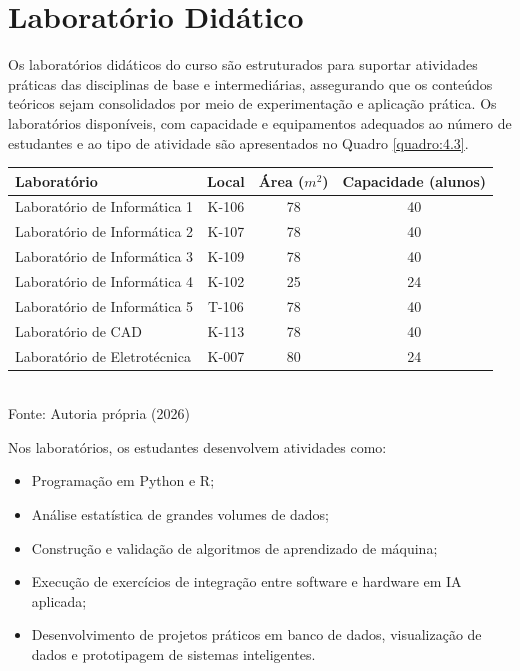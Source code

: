\section{Laboratório Didático}

Os laboratórios didáticos do curso são estruturados para suportar atividades práticas das disciplinas de base e intermediárias, assegurando que os conteúdos teóricos sejam consolidados por meio de experimentação e aplicação prática. Os laboratórios disponíveis, com capacidade e equipamentos adequados ao número de estudantes e ao tipo de atividade são apresentados no Quadro \ref{quadro:4.3}.

\begin{quadro}[htb]
    \centering
    \caption{Características dos laboratórios didáticos}
    \label{quadro:4.3}
    \vspace{0.2cm}
    \begin{tabular}{|l|c|c|c|}
        \hline
        \textbf{Laboratório} & \textbf{Local} & \textbf{Área ($m^2$)} & \textbf{Capacidade (alunos)} \\ \hline
        Laboratório de Informática 1 & K-106 & 78 & 40 \\ \hline
        Laboratório de Informática 2 & K-107 & 78 & 40 \\ \hline
        Laboratório de Informática 3 & K-109 & 78 & 40 \\ \hline
        Laboratório de Informática 4 & K-102 & 25 & 24 \\ \hline
        Laboratório de Informática 5 & T-106 & 78 & 40 \\ \hline
        Laboratório de CAD & K-113 & 78 & 40 \\ \hline
        Laboratório de Eletrotécnica & K-007 & 80 & 24 \\ \hline
    \end{tabular}
    \small \\ Fonte: Autoria própria (2026)
\end{quadro}

Nos laboratórios, os estudantes desenvolvem atividades como:

\begin{itemize}
    \item Programação em Python e R;
    \item Análise estatística de grandes volumes de dados;
    \item Construção e validação de algoritmos de aprendizado de máquina;
    \item Execução de exercícios de integração entre software e hardware em IA aplicada;
    \item Desenvolvimento de projetos práticos em banco de dados, visualização de dados e prototipagem de sistemas inteligentes.
\end{itemize}

